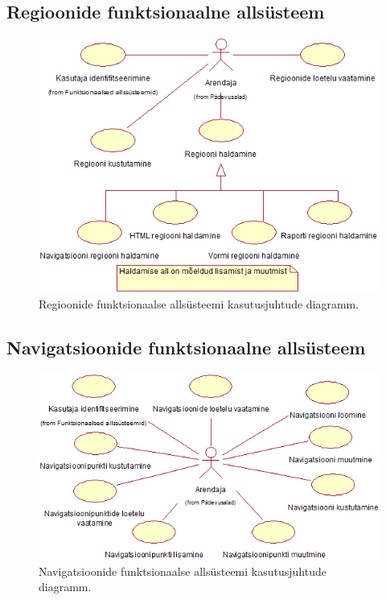 \documentclass[a4paper,12pt]{article} %
\begin{document}
\subsection*{Regioonide funktsionaalne allsüsteem}
\begin{figure}[H]
\centering
\includegraphics[width=\textwidth]{./diagrams/regions-subsystem-use-case-digram.png}
\caption{Regioonide funktsionaalse allsüsteemi kasutusjuhtude diagramm.}
\label{fig_regioonide_funktsionaalse_allsüsteemi_kasutusjuhtude_eskiismudel}
\end{figure}

\subsection*{Navigatsioonide funktsionaalne allsüsteem}
\begin{figure}[H]
\centering
\includegraphics[width=\textwidth]{./diagrams/navigations-subsystem-use-case-digram.png}
\caption{Navigatsioonide funktsionaalse allsüsteemi kasutusjuhtude diagramm.}
\label{fig_navigatsioonide_funktsionaalse_allsüsteemi_kasutusjuhtude_eskiismudel}
\end{figure}
\end{document}
